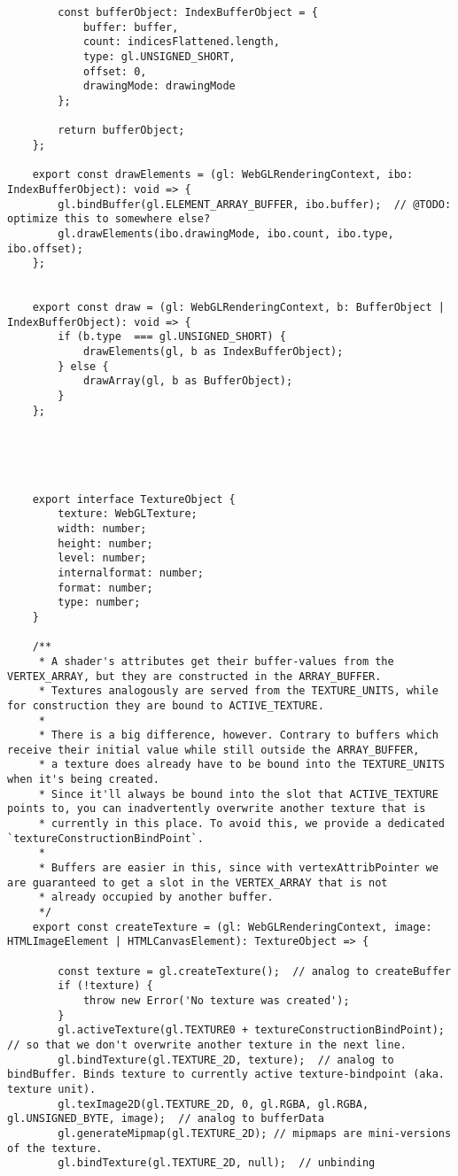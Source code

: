 \begin{lstlisting}
        const bufferObject: IndexBufferObject = {
            buffer: buffer,
            count: indicesFlattened.length,
            type: gl.UNSIGNED_SHORT,
            offset: 0,
            drawingMode: drawingMode
        };
    
        return bufferObject;
    };
    
    export const drawElements = (gl: WebGLRenderingContext, ibo: IndexBufferObject): void => {
        gl.bindBuffer(gl.ELEMENT_ARRAY_BUFFER, ibo.buffer);  // @TODO: optimize this to somewhere else?
        gl.drawElements(ibo.drawingMode, ibo.count, ibo.type, ibo.offset);
    };
    
    
    export const draw = (gl: WebGLRenderingContext, b: BufferObject | IndexBufferObject): void => {
        if (b.type  === gl.UNSIGNED_SHORT) {
            drawElements(gl, b as IndexBufferObject);
        } else {
            drawArray(gl, b as BufferObject);
        }
    };
    
    
    
    
    
    export interface TextureObject {
        texture: WebGLTexture;
        width: number;
        height: number;
        level: number;
        internalformat: number;
        format: number;
        type: number;
    }
    
    /**
     * A shader's attributes get their buffer-values from the VERTEX_ARRAY, but they are constructed in the ARRAY_BUFFER.
     * Textures analogously are served from the TEXTURE_UNITS, while for construction they are bound to ACTIVE_TEXTURE.
     *
     * There is a big difference, however. Contrary to buffers which receive their initial value while still outside the ARRAY_BUFFER,
     * a texture does already have to be bound into the TEXTURE_UNITS when it's being created.
     * Since it'll always be bound into the slot that ACTIVE_TEXTURE points to, you can inadvertently overwrite another texture that is
     * currently in this place. To avoid this, we provide a dedicated `textureConstructionBindPoint`.
     *
     * Buffers are easier in this, since with vertexAttribPointer we are guaranteed to get a slot in the VERTEX_ARRAY that is not
     * already occupied by another buffer.
     */
    export const createTexture = (gl: WebGLRenderingContext, image: HTMLImageElement | HTMLCanvasElement): TextureObject => {
    
        const texture = gl.createTexture();  // analog to createBuffer
        if (!texture) {
            throw new Error('No texture was created');
        }
        gl.activeTexture(gl.TEXTURE0 + textureConstructionBindPoint); // so that we don't overwrite another texture in the next line.
        gl.bindTexture(gl.TEXTURE_2D, texture);  // analog to bindBuffer. Binds texture to currently active texture-bindpoint (aka. texture unit).
        gl.texImage2D(gl.TEXTURE_2D, 0, gl.RGBA, gl.RGBA, gl.UNSIGNED_BYTE, image);  // analog to bufferData
        gl.generateMipmap(gl.TEXTURE_2D); // mipmaps are mini-versions of the texture.
        gl.bindTexture(gl.TEXTURE_2D, null);  // unbinding
    

\end{lstlisting}
